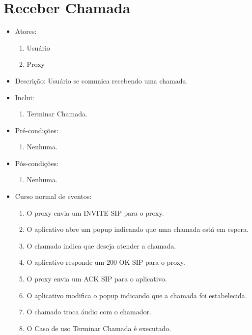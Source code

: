\documentclass[12pt,a4paper]{article}
\begin{document}
\section{Receber Chamada}
\begin{itemize}
	\item Atores:
	\begin{enumerate}
		\item Usu\'{a}rio
		\item Proxy
	\end{enumerate}
	\item Descri\c{c}\~{a}o: Usu\'{a}rio se comunica recebendo uma chamada. 
	\item Inclui:
	\begin{enumerate}
        \item Terminar Chamada.
	\end{enumerate}
    \item Pr\'{e}-condi\c{c}\~{o}es:
	\begin{enumerate}
		\item Nenhuma.
	\end{enumerate}
	\item P\'{o}s-condi\c{c}\~{o}es:
	\begin{enumerate}
		\item Nenhuma.
	\end{enumerate}
	\item Curso normal de eventos:
	\begin{enumerate}
        \item O proxy envia um INVITE SIP para o proxy.
        \item O aplicativo abre um popup indicando que uma chamada est\'{a} em espera.
        \item O chamado indica que deseja atender a chamada.
        \item O aplicativo responde um 200 OK SIP para o proxy.
        \item O proxy envia um ACK SIP para o aplicativo.
        \item O aplicativo modifica o popup indicando que a chamada foi estabelecida.
        \item O chamado troca \'{a}udio com o chamador.
        \item O Caso de uso Terminar Chamada \'{e} executado.
	\end{enumerate}	
\end{itemize}
\end{document}
